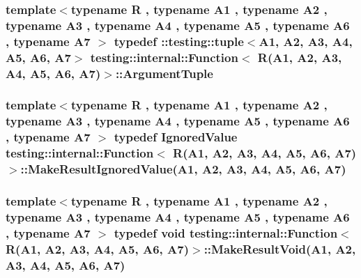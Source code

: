 \subsubsection[{\texorpdfstring{Argument\+Tuple}{ArgumentTuple}}]{\setlength{\rightskip}{0pt plus 5cm}template$<$typename R , typename A1 , typename A2 , typename A3 , typename A4 , typename A5 , typename A6 , typename A7 $>$ typedef \+::testing\+::tuple$<$A1, A2, A3, A4, A5, A6, A7$>$ {\bf testing\+::internal\+::\+Function}$<$ R(A1, A2, A3, A4, A5, A6, A7)$>$\+::{\bf Argument\+Tuple}}\hypertarget{structtesting_1_1internal_1_1Function_3_01R_07A1_00_01A2_00_01A3_00_01A4_00_01A5_00_01A6_00_01A7_08_4_a6bbc1f28c56e599aca98ab8ae7caf9ab}{}\label{structtesting_1_1internal_1_1Function_3_01R_07A1_00_01A2_00_01A3_00_01A4_00_01A5_00_01A6_00_01A7_08_4_a6bbc1f28c56e599aca98ab8ae7caf9ab}
\subsubsection[{\texorpdfstring{Make\+Result\+Ignored\+Value}{MakeResultIgnoredValue}}]{\setlength{\rightskip}{0pt plus 5cm}template$<$typename R , typename A1 , typename A2 , typename A3 , typename A4 , typename A5 , typename A6 , typename A7 $>$ typedef {\bf Ignored\+Value} {\bf testing\+::internal\+::\+Function}$<$ R(A1, A2, A3, A4, A5, A6, A7)$>$\+::Make\+Result\+Ignored\+Value(A1, A2, A3, A4, A5, A6, A7)}\hypertarget{structtesting_1_1internal_1_1Function_3_01R_07A1_00_01A2_00_01A3_00_01A4_00_01A5_00_01A6_00_01A7_08_4_a12b0ade73c76ea564afa7dd2b5c219b6}{}\label{structtesting_1_1internal_1_1Function_3_01R_07A1_00_01A2_00_01A3_00_01A4_00_01A5_00_01A6_00_01A7_08_4_a12b0ade73c76ea564afa7dd2b5c219b6}
\subsubsection[{\texorpdfstring{Make\+Result\+Void}{MakeResultVoid}}]{\setlength{\rightskip}{0pt plus 5cm}template$<$typename R , typename A1 , typename A2 , typename A3 , typename A4 , typename A5 , typename A6 , typename A7 $>$ typedef void {\bf testing\+::internal\+::\+Function}$<$ R(A1, A2, A3, A4, A5, A6, A7)$>$\+::Make\+Result\+Void(A1, A2, A3, A4, A5, A6, A7)}\hypertarget{structtesting_1_1internal_1_1Function_3_01R_07A1_00_01A2_00_01A3_00_01A4_00_01A5_00_01A6_00_01A7_08_4_a9e3d04c8472e00161b080690f62f9eb4}{}\label{structtesting_1_1internal_1_1Function_3_01R_07A1_00_01A2_00_01A3_00_01A4_00_01A5_00_01A6_00_01A7_08_4_a9e3d04c8472e00161b080690f62f9eb4}


